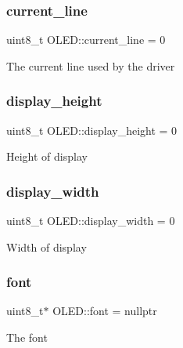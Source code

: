 \subsubsection{\texorpdfstring{current\+\_\+line}{current\_line}}
{\footnotesize\ttfamily uint8\+\_\+t O\+L\+E\+D\+::current\+\_\+line = 0\hspace{0.3cm}{\ttfamily [protected]}}

The current line used by the driver \hypertarget{class_o_l_e_d_add08b51dec0ffeebcba7902c3bd4aeea}{}\label{class_o_l_e_d_add08b51dec0ffeebcba7902c3bd4aeea} 
\subsubsection{\texorpdfstring{display\+\_\+height}{display\_height}}
{\footnotesize\ttfamily uint8\+\_\+t O\+L\+E\+D\+::display\+\_\+height = 0\hspace{0.3cm}{\ttfamily [protected]}}

Height of display \hypertarget{class_o_l_e_d_a2e9305cb3341509bb62d61f33cae76fd}{}\label{class_o_l_e_d_a2e9305cb3341509bb62d61f33cae76fd} 
\subsubsection{\texorpdfstring{display\+\_\+width}{display\_width}}
{\footnotesize\ttfamily uint8\+\_\+t O\+L\+E\+D\+::display\+\_\+width = 0\hspace{0.3cm}{\ttfamily [protected]}}

Width of display \hypertarget{class_o_l_e_d_a29ab86a4a73f4d343bf1810927f0911d}{}\label{class_o_l_e_d_a29ab86a4a73f4d343bf1810927f0911d} 
\subsubsection{\texorpdfstring{font}{font}}
{\footnotesize\ttfamily uint8\+\_\+t$\ast$ O\+L\+E\+D\+::font = nullptr\hspace{0.3cm}{\ttfamily [protected]}}

The font \hypertarget{class_o_l_e_d_a85b91421932866dea031921799ba83a3}{}\label{class_o_l_e_d_a85b91421932866dea031921799ba83a3} 
